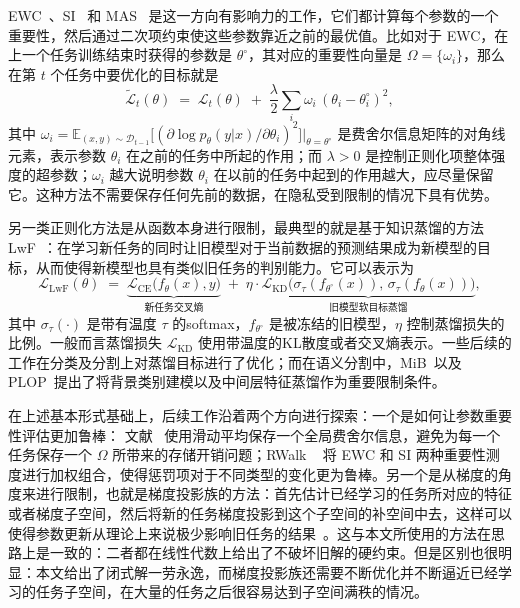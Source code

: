 EWC~\citep{kirkpatrick2017ewc}、SI~\citep{zenke2017continual} 和 MAS~\citep{aljundi2018memory} 是这一方向有影响力的工作，它们都计算每个参数的一个重要性，然后通过二次项约束使这些参数靠近之前的最优值。比如对于 EWC，在上一个任务训练结束时获得的参数是 $\theta^{\circ}$，其对应的重要性向量是 $\Omega=\{\omega_i\}$，那么在第 $t$ 个任务中要优化的目标就是
\begin{equation}
\widetilde{\mathcal{L}}_{t}(\theta)\;=\;\mathcal{L}_t(\theta)\;+\;\frac{\lambda}{2}\sum_{i}\omega_i\,(\theta_i-\theta^{\circ}_i)^{2},
\label{eq:ewc_obj}
\end{equation}
其中 $\omega_i=\mathbb{E}_{(x,y)\sim\mathcal{D}_{t-1}}\big[(\partial \log p_\theta(y|x)/\partial\theta_i)^2\big]\big|_{\theta=\theta^\circ}$ 是费舍尔信息矩阵的对角线元素，表示参数 $\theta_i$ 在之前的任务中所起的作用；而 $\lambda > 0$ 是控制正则化项整体强度的超参数；$\omega_i$ 越大说明参数 $\theta_i$ 在以前的任务中起到的作用越大，应尽量保留它。这种方法不需要保存任何先前的数据，在隐私受到限制的情况下具有优势。

另一类正则化方法是从函数本身进行限制，最典型的就是基于知识蒸馏的方法LwF~\citep{li2017learning}：在学习新任务的同时让旧模型对于当前数据的预测结果成为新模型的目标，从而使得新模型也具有类似旧任务的判别能力。它可以表示为
\begin{equation}
\mathcal{L}_{\mathrm{LwF}}(\theta)\;=\;\underbrace{\mathcal{L}_{\mathrm{CE}}\!\big(f_\theta(x),y\big)}_{\text{新任务交叉熵}}\;+\;\eta\cdot\underbrace{\mathcal{L}_{\mathrm{KD}}\!\big(\sigma_\tau(f_{\theta^{\circ}}(x)),\,\sigma_\tau(f_\theta(x))\big)}_{\text{旧模型软目标蒸馏}},
\label{eq:lwf_obj}
\end{equation}
其中 $\sigma_\tau(\cdot)$ 是带有温度 $\tau$ 的softmax，$f_{\theta^{\circ}}$ 是被冻结的旧模型，$\eta$ 控制蒸馏损失的比例。一般而言蒸馏损失 $\mathcal{L}_{\mathrm{KD}}$ 使用带温度的KL散度或者交叉熵表示。一些后续的工作在分类及分割上对蒸馏目标进行了优化；而在语义分割中，MiB~\citep{cermelli2020mib}以及PLOP~\citep{douillard2021plop}提出了将背景类别建模以及中间层特征蒸馏作为重要限制条件。

在上述基本形式基础上，后续工作沿着两个方向进行探索：一个是如何让参数重要性评估更加鲁棒： 文献~\citep{schwarz2018progress} 使用滑动平均保存一个全局费舍尔信息，避免为每一个任务保存一个 $\Omega$ 所带来的存储开销问题；RWalk ~\citep{chaudhry2021using} 将 EWC 和 SI 两种重要性测度进行加权组合，使得惩罚项对于不同类型的变化更为鲁棒。另一个是从梯度的角度来进行限制，也就是梯度投影族的方法：首先估计已经学习的任务所对应的特征或者梯度子空间，然后将新的任务梯度投影到这个子空间的补空间中去，这样可以使得参数更新从理论上来说极少影响旧任务的结果~\citep{wang2023orthogonal, chaudhry2019continual, lopez2017gradient}。这与本文所使用的方法在思路上是一致的：二者都在线性代数上给出了不破坏旧解的硬约束。但是区别也很明显：本文给出了闭式解一劳永逸，而梯度投影族还需要不断优化并不断逼近已经学习的任务子空间，在大量的任务之后很容易达到子空间满秩的情况。

